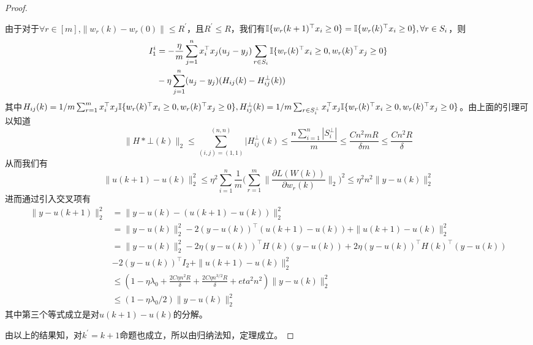 \begin{proof}
\[\]
\par
由于对于$\forall r\in[m]$,$\|w_r(k)-w_r(0)\|\leq R^\prime$，且$R^\prime \le R$，我们有$\mathbb{I}\{w_r(k+1)^\top x_i\geq 0\} = \mathbb{I}\{w_r(k)^\top x_i \geq 0\}, \forall r \in S_i$，则
\[
\begin{aligned}
I_1^i &= -\frac{\eta}{m}\sum_{j=1}^n x_i^\top x_j (u_j-y_j)\sum_{r\in S_i}\mathbb{I}\{w_r(k)^\top x_i\geq 0,w_r(k)^\top x_j \geq 0\}\\
 & -\eta\sum_{j=1}^n (u_j-y_j)(H_{ij}(k) - H_{ij}^\bot(k))
\end{aligned}
\]
其中$H_{ij}(k) = 1/m\sum_{r=1}^m x_i^\top x_j\mathbb{I}\{w_r(k)^\top x_i\geq 0, w_r(k)^\top x_j\geq 0\}, H_{ij}^\bot(k) = 1/m\sum_{r\in S_i^\bot} x_i^\top x_j\mathbb{I}\{w_r(k)^\top x_i\geq 0, w_r(k)^\top x_j\geq 0\}$。由上面的引理可以知道
\[
\|H*\bot(k)\|_2 \leq \sum_{(i,j)=(1,1)}^{(n,n)}|H_{ij}^\bot (k)\leq \frac{n\sum_{i=1}^n |S_i^\bot|}{m} \leq \frac{Cn^2 mR}{\delta m} \leq \frac{Cn^2R}{\delta}
\]
从而我们有
\[
\|u(k+1)-u(k)\|_2^2 \leq \eta^2\sum_{i=1}^n \frac{1}{m}\bigg(\sum_{r = 1}^m\|\frac{\partial L(W(k))}{\partial w_r(k)}\|_2 \bigg)^2\leq \eta^2 n^2\|y-u(k)\|_2^2
\]
进而通过引入交叉项有
\[
\begin{aligned}
\|y-u(k+1)\|_2^2 & = \|y-u(k) -(u(k+1)-u(k))\|_2^2\\
 & = \|y-u(k)\|_2^2 -2 (y-u(k))^\top (u(k+1)-u(k))+\|u(k+1)-u(k)\|_2^2\\
 & = \|y-u(k)\|_2^2 -2 \eta(y-u(k))^\top H(k)(y-u(k))+2\eta(y-u(k))^\top H(k)^\top (y-u(k)) \\
 & - 2(y-u(k))^\top I_2 + \|u(k+1)- u(k)\|_2^2\\
 & \leq (1-\eta\lambda_0+ \frac{2C\eta n^2R}{\delta} + \frac{2C\eta n^{3/2}R}{\delta}+eta^2 n^2)\|y-u(k)\|_2^2\\
 & \leq (1-\eta\lambda_0/2)\|y-u(k)\|_2^2
\end{aligned}
\]
其中第三个等式成立是对$u(k+1)-u(k)$的分解。
\par
由以上的结果知，对$k^\prime = k+1$命题也成立，所以由归纳法知，定理成立。
\end{proof}


